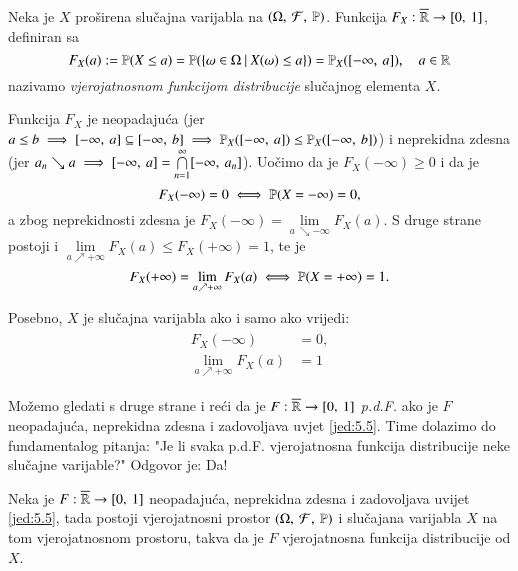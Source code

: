 \begin{defn}    \label{defn:5.4}
    Neka je $X$ pro\v sirena slu\v cajna varijabla na $(\Omega, \: \mathcal{F}, \: \mathbb{P})$.
    Funkcija $F_X : \overline{\mathbb{R}} \to [{0}, \:{1}]$, definiran sa
    \begin{equation*}
        F_X (a) := \mathbb{P} (X \leq a) = \mathbb{P} (\{{\omega \in \Omega} \: | \: {X(\omega) \leq a}\}) = \mathbb{P}_X ([{-\infty}, \:{a}]), \quad a \in \mathbb{R}
    \end{equation*}
    nazivamo \emph{vjerojatnosnom funkcijom distribucije} slu\v cajnog elementa $X$.
\end{defn}

Funkcija $F_X$ je neopadaju\' ca (jer $a \leq b \implies [{-\infty}, \:{a}] \subseteq [{-\infty}, \:{b}] \implies \mathbb{P}_X ([{-\infty}, \:{a}]) \leq \mathbb{P}_X ([{-\infty}, \:{b}]) $) i neprekidna zdesna (jer $a_n \searrow a \implies [{-\infty}, \:{a}] = \bigcap\limits_{n = 1}^{\infty} [{-\infty}, \:{a_n}]$).
Uo\v cimo da je $F_X (-\infty) \geq 0$ i da je
\begin{equation*}
    F_X (-\infty) = 0 \iff \mathbb{P} (X = -\infty) = 0,
\end{equation*}
a zbog neprekidnosti zdesna je $F_X (-\infty) = \lim\limits_{a \ \searrow -\infty} F_X (a)$.
S druge strane postoji i $\lim\limits_{a \nearrow +\infty} F_X (a) \leq F_X(+\infty) = 1$, te je
\begin{equation*}
    F_X(+\infty) = \lim\limits_{a \nearrow +\infty} F_X (a) \iff \mathbb{P} (X = +\infty) = 1.
\end{equation*}

Posebno, $X$ je slu\v cajna varijabla ako i samo ako vrijedi:
\begin{align}    \label{jed:5.5}
    \begin{split}
        F_X(-\infty) &= 0, \\
        \lim\limits_{a \nearrow +\infty} F_X(a) &= 1
    \end{split}
\end{align}

Mo\v zemo gledati s druge strane i re\' ci da je $F: \overline{\mathbb{R}} \to [{0}, \:{1}]$ \emph{p.d.F.} ako je $F$ neopadaju\' ca, neprekidna zdesna i zadovoljava uvjet \eqref{jed:5.5}.
Time dolazimo do fundamentalog pitanja: "Je li svaka p.d.F. vjerojatnosna funkcija distribucije neke slu\v cajne varijable?"
Odgovor je: Da!

\begin{tm}  \label{tm:5.6}
    Neka je $F: \overline{\mathbb{R}} \to [{0}, \:{1}]$ neopadaju\' ca, neprekidna zdesna i zadovoljava uvijet \eqref{jed:5.5}, tada postoji vjerojatnosni prostor $(\Omega, \: \mathcal{F}, \: \mathbb{P})$ i slu\v cajana varijabla $X$ na tom vjerojatnosnom prostoru, takva da je $F$ vjerojatnosna funkcija distribucije od $X$.
\end{tm}

